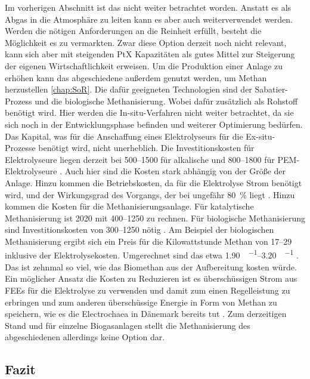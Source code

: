 Im vorherigen Abschnitt ist das  nicht weiter betrachtet worden. Anstatt es als Abgas in die Atmosphäre zu leiten kann es aber auch weiterverwendet werden. Werden die nötigen Anforderungen an die Reinheit erfüllt, besteht die Möglichkeit es zu vermarkten. Zwar diese Option derzeit noch nicht relevant, kann sich aber mit steigenden PtX Kapazitäten als gutes Mittel zur Steigerung der eigenen Wirtschaftlichkeit erweisen. \parencite{UmBA19} \newline
Um die Produktion einer Anlage zu erhöhen kann das abgeschiedene  außerdem genutzt werden, um Methan herzustellen \ref{chap:SoR}. Die dafür geeigneten Technologien sind der Sabatier-Prozess und die biologische Methanisierung. Wobei dafür zusätzlich  als Rohstoff benötigt wird. Hier werden die In-situ-Verfahren nicht weiter betrachtet, da sie sich noch in der Entwicklungsphase befinden und weiterer Optimierung bedürfen. Das Kapital, was für die Anschaffung eines Elektrolyseurs für die Ex-situ-Prozesse benötigt wird, nicht unerheblich. Die Investitionskosten für Elektrolyseure liegen derzeit bei \SIrange{500}{1500}{\Eurkw} für alkalische und \SIrange{800}{1800}{\Eurkw} für PEM-Elektrolyseure \parencite{dena2018b}. Auch hier sind die Kosten stark abhängig von der Größe der Anlage. Hinzu kommen die Betriebskosten, da für die Elektrolyse Strom benötigt wird, und der Wirkungsgrad des Vorgangs, der bei ungefähr \SI{80}{\percent} liegt \parencite{dena2018b}. Hinzu kommen die Kosten für die Methanisierungsanlage. Für katalytische Methanisierung ist \SI{2020}{\relax} mit \SIrange{400}{1250}{\Eurkw} zu rechnen. Für biologische Methanisierung sind Investitionskosten von \SIrange{300}{1250}{\Eurkw} nötig \parencite{dena2018b}. Am Beispiel der biologischen Methanisierung ergibt sich ein Preis für die Kilowattstunde Methan von \SIrange{17}{29}{\ct} inklusive der Elektrolysekosten. Umgerechnet sind das etwa \SIrange{1,90}{3,20}{\sieuro\per\normvol} \parencite{4.2b17}. Das ist zehnmal so viel, wie das Biomethan aus der Aufbereitung kosten würde. Ein möglicher Ansatz die Kosten zu Reduzieren ist es überschüssigen Strom aus \glspl{FEE} für die Elektrolyse zu verwenden und damit zum einen Regelleistung zu erbringen und zum anderen überschüssige Energie in Form von Methan zu speichern, wie es die Electrochaea in Dänemark bereits tut \parencite{Chaea20}. Zum derzeitigen Stand und für einzelne Biogasanlagen stellt die Methanisierung des abgeschiedenen  allerdings keine Option dar.


\subsection{Fazit}

